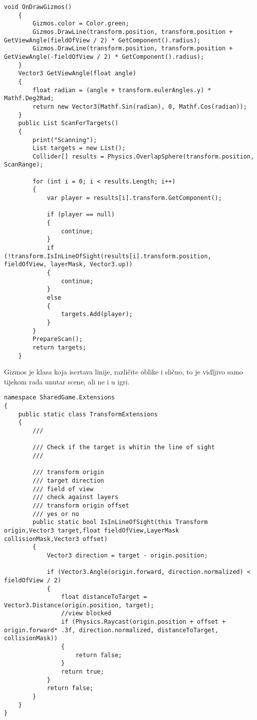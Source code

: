 \begin{lstlisting}[caption={Pretraživanje područja}, label=Scanner]
void OnDrawGizmos()
    {
        Gizmos.color = Color.green;
        Gizmos.DrawLine(transform.position, transform.position + GetViewAngle(fieldOfView / 2) * GetComponent().radius);
        Gizmos.DrawLine(transform.position, transform.position + GetViewAngle(-fieldOfView / 2) * GetComponent().radius);
    }
    Vector3 GetViewAngle(float angle)
    {
        float radian = (angle + transform.eulerAngles.y) * Mathf.Deg2Rad;
        return new Vector3(Mathf.Sin(radian), 0, Mathf.Cos(radian));
    }
    public List ScanForTargets()
    {
        print("Scanning");
        List targets = new List();
        Collider[] results = Physics.OverlapSphere(transform.position, ScanRange);

        for (int i = 0; i < results.Length; i++)
        {
            var player = results[i].transform.GetComponent();

            if (player == null)
            {
                continue;
            }
            if (!transform.IsInLineOfSight(results[i].transform.position, fieldOfView, layerMask, Vector3.up))
            {
                continue;
            }
            else
            {
                targets.Add(player);
            }
        }
        PrepareScan();
        return targets;
    }
\end{lstlisting}

Gizmos je klasa koja iscrtava linije, različite oblike i slično, to je vidljivo samo tijekom rada unutar scene, ali ne i u igri.

\begin{lstlisting}[caption={Proširivanje klasa}, label=TransformExtension]
namespace SharedGame.Extensions
{
    public static class TransformExtensions
    {
        /// 

        /// Check if the target is whitin the line of sight
        /// 

        /// transform origin
        /// target direction
        /// field of view
        /// check against layers
        /// transform origin offset
        /// yes or no
        public static bool IsInLineOfSight(this Transform origin,Vector3 target,float fieldOfView,LayerMask collisionMask,Vector3 offset)
        {
            Vector3 direction = target - origin.position;

            if (Vector3.Angle(origin.forward, direction.normalized) < fieldOfView / 2)
            {
                float distanceToTarget = Vector3.Distance(origin.position, target);
                //view blocked
                if (Physics.Raycast(origin.position + offset + origin.forward* .3f, direction.normalized, distanceToTarget, collisionMask))
                {
                    return false;
                }
                return true;
            }
            return false;
        }
    }
}
\end{lstlisting}

